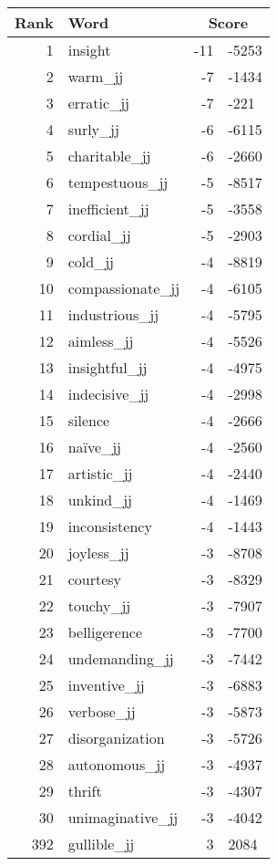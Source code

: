 \begin{longtable}[!htbp]{| rlr@{.}l |}
    \hline
    \textbf{Rank} & \textbf{Word} & \multicolumn{2}{c|}{\textbf{Score}} \\
    \hline
    \endhead
    1 & insight & -11 & -5253 \\
    2 & warm\_jj & -7 & -1434 \\
    3 & erratic\_jj & -7 & -221 \\
    4 & surly\_jj & -6 & -6115 \\
    5 & charitable\_jj & -6 & -2660 \\
    6 & tempestuous\_jj & -5 & -8517 \\
    7 & inefficient\_jj & -5 & -3558 \\
    8 & cordial\_jj & -5 & -2903 \\
    9 & cold\_jj & -4 & -8819 \\
    10 & compassionate\_jj & -4 & -6105 \\
    11 & industrious\_jj & -4 & -5795 \\
    12 & aimless\_jj & -4 & -5526 \\
    13 & insightful\_jj & -4 & -4975 \\
    14 & indecisive\_jj & -4 & -2998 \\
    15 & silence & -4 & -2666 \\
    16 & naïve\_jj & -4 & -2560 \\
    17 & artistic\_jj & -4 & -2440 \\
    18 & unkind\_jj & -4 & -1469 \\
    19 & inconsistency & -4 & -1443 \\
    20 & joyless\_jj & -3 & -8708 \\
    21 & courtesy & -3 & -8329 \\
    22 & touchy\_jj & -3 & -7907 \\
    23 & belligerence & -3 & -7700 \\
    24 & undemanding\_jj & -3 & -7442 \\
    25 & inventive\_jj & -3 & -6883 \\
    26 & verbose\_jj & -3 & -5873 \\
    27 & disorganization & -3 & -5726 \\
    28 & autonomous\_jj & -3 & -4937 \\
    29 & thrift & -3 & -4307 \\
    30 & unimaginative\_jj & -3 & -4042 \\
    392 & gullible\_jj & 3 & 2084 \\

\end{longtable}
